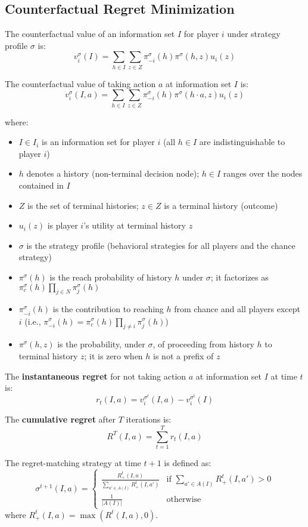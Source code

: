 \documentclass[12pt,a4paper]{article}
\begin{document}
\subsection{Counterfactual Regret Minimization}

The counterfactual value of an information set $I$ for player $i$ under strategy profile $\sigma$ is:
$$v_i^\sigma(I) = \sum_{h \in I} \sum_{z \in Z} \pi_{-i}^\sigma(h) \pi^\sigma(h, z) u_i(z)$$

The counterfactual value of taking action $a$ at information set $I$ is:
$$v_i^\sigma(I, a) = \sum_{h \in I} \sum_{z \in Z} \pi_{-i}^\sigma(h) \pi^\sigma(h \cdot a, z) u_i(z)$$

where:
\begin{itemize}
\item $I \in I_i$ is an information set for player $i$ (all $h \in I$ are indistinguishable to player $i$)
\item $h$ denotes a history (non-terminal decision node); $h \in I$ ranges over the nodes contained in $I$
\item $Z$ is the set of terminal histories; $z \in Z$ is a terminal history (outcome)
\item $u_i(z)$ is player $i$'s utility at terminal history $z$
\item $\sigma$ is the strategy profile (behavioral strategies for all players and the chance strategy)
\item $\pi^\sigma(h)$ is the reach probability of history $h$ under $\sigma$; it factorizes as $\pi_c^\sigma(h) \prod_{j\in N} \pi_j^\sigma(h)$
\item $\pi_{-i}^\sigma(h)$ is the contribution to reaching $h$ from chance and all players except $i$ (i.e., $\pi_{-i}^\sigma(h) = \pi_c^\sigma(h) \prod_{j\neq i} \pi_j^\sigma(h)$)
\item $\pi^\sigma(h, z)$ is the probability, under $\sigma$, of proceeding from history $h$ to terminal history $z$; it is zero when $h$ is not a prefix of $z$
\end{itemize}

The \textbf{instantaneous regret} for not taking action $a$ at information set $I$ at time $t$ is:
$$r_t(I, a) = v_i^{\sigma^t}(I, a) - v_i^{\sigma^t}(I)$$

The \textbf{cumulative regret} after $T$ iterations is:
$$R^T(I, a) = \sum_{t=1}^T r_t(I, a)$$

The regret-matching strategy at time $t+1$ is defined as:
$$\sigma^{t+1}(I, a) = \begin{cases}
\frac{R^t_+(I, a)}{\sum_{a' \in A(I)} R^t_+(I, a')} & \text{if } \sum_{a' \in A(I)} R^t_+(I, a') > 0 \\
\frac{1}{|A(I)|} & \text{otherwise}
\end{cases}$$
where $R^t_+(I, a) = \max(R^t(I, a), 0)$.
\end{document}
